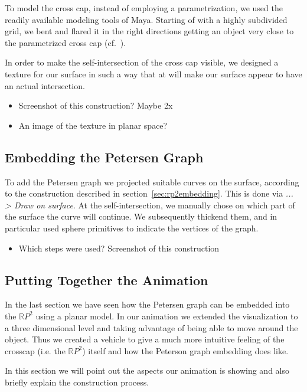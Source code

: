 \documentclass[11pt,            %
               a4paper,         %
               oneside,         %
               DIV12,           %
               fleqn,           %
               halfparskip,     %
               nochapterprefix, %
              ]{scrartcl} %
\theoremstyle{definition}
\begin{document}
To model the cross cap, instead of employing a parametrization, we used
the readily available modeling tools of Maya.
Starting of with a highly subdivided grid, we bent and flared it in
the right directions getting an object very close to the parametrized
cross cap (cf.~\cite{rp2}).

In order to make the self-intersection of the cross cap visible, we
designed a texture for our surface in such a way that at will make our
surface appear to have an actual intersection.

\begin{itemize}
  \item Screenshot of this construction? Maybe 2x
  \item An image of the texture in planar space?
\end{itemize}

\subsection{Embedding the Petersen Graph}

To add the Petersen graph we projected suitable curves on the surface,
according to the construction described in
section~\ref{sec:rp2embedding}.
This is done via \emph{... > Draw on surface}.
At the self-intersection, we manually chose on which part of the surface
the curve will continue.
We subsequently thickend them, and in particular used sphere
primitives to indicate the vertices of the graph.

\begin{itemize}
  \item Which steps were used? Screenshot of this construction
\end{itemize}

\subsection{Putting Together the Animation}

In the last section we have seen how the Petersen graph can be
embedded into the $\mathbb{R}P^2$ using a planar model. In our
animation we extended the visualization to a three dimensional level
and taking advantage of being able to move around the object. Thus we
created a vehicle to give a much more intuitive feeling of the
crosscap (i.e. the $\mathbb{R}P^2$) itself and how the Peterson graph
embedding does like.

In this section we will point out the aspects our animation is showing and also briefly explain the construction process.
\end{document}
